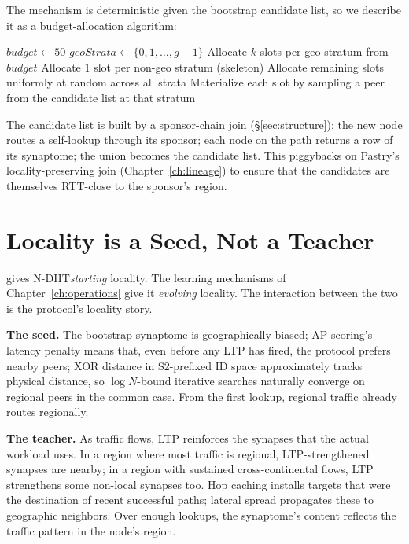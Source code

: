 \documentclass[twoside,nobib]{tufte-book}
\newcommand{\NDHT}{N-DHT\xspace}
\begin{document}
The mechanism is deterministic given the bootstrap candidate
list, so we describe it as a budget-allocation algorithm:

\begin{algorithm}
\caption{Stratified bootstrap (sketch)}
\begin{algorithmic}[1]
\State $\mathit{budget} \gets 50$
\State $\mathit{geoStrata} \gets \{0, 1, \ldots, g - 1\}$
\State Allocate $k$ slots per geo stratum from $\mathit{budget}$
\State Allocate $1$ slot per non-geo stratum (skeleton)
\State Allocate remaining slots uniformly at random across all
strata
\State Materialize each slot by sampling a peer from the
candidate list at that stratum
\end{algorithmic}
\end{algorithm}

The candidate list is built by a sponsor-chain join (\S\ref{sec:structure}):
the new node routes a self-lookup through its sponsor; each node
on the path returns a row of its synaptome; the union becomes the
candidate list. This piggybacks on Pastry's locality-preserving
join (Chapter~\ref{ch:lineage}) to ensure that the candidates are
themselves RTT-close to the sponsor's region.

\section{Locality is a Seed, Not a Teacher}

 gives \NDHT \emph{starting} locality.
The learning mechanisms of Chapter~\ref{ch:operations} give it
\emph{evolving} locality. The interaction between the two is
the protocol's locality story.

\textbf{The seed.} The bootstrap synaptome is geographically
biased; AP scoring's latency penalty means that, even before any
LTP has fired, the protocol prefers nearby peers; XOR distance in
S2-prefixed ID space approximately tracks physical distance, so
$\log N$-bound iterative searches naturally converge on regional
peers in the common case. From the first lookup, regional traffic
already routes regionally.

\textbf{The teacher.} As traffic flows, LTP reinforces the
synapses that the actual workload uses. In a region where most
traffic is regional, LTP-strengthened synapses are nearby; in a
region with sustained cross-continental flows, LTP strengthens
some non-local synapses too. Hop caching installs targets that
were the destination of recent successful paths; lateral spread
propagates these to geographic neighbors. Over enough lookups,
the synaptome's content reflects the traffic pattern in the
node's region.
\end{document}
